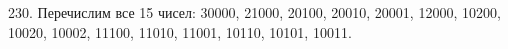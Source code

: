 230. Перечислим все 15 чисел: 30000, 21000, 20100, 20010, 20001, 12000, 10200, 10020, 10002, 11100, 11010, 11001, 10110, 10101, 10011.\\
